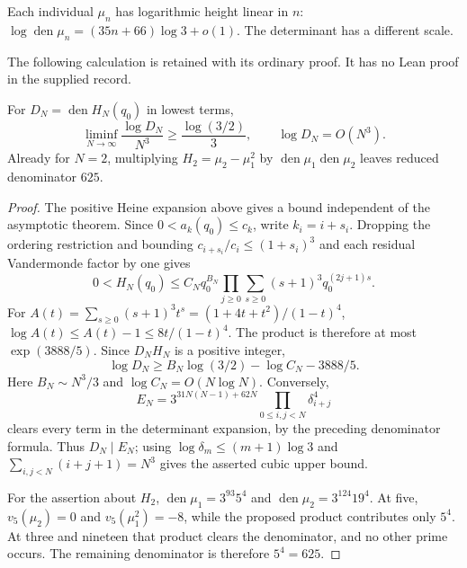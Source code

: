 \documentclass[11pt]{article}
\begin{document}
Each individual $\mu_n$ has logarithmic height linear in $n$:
$\log\operatorname{den}\mu_n=(35n+66)\log3+o(1)$.
The determinant has a different scale.

The following calculation is retained with its ordinary proof. It has
no Lean proof in the supplied record.

\begin{remark}
\label{long1049:prop:calibrated-height}
For $D_N=\operatorname{den}H_N(q_0)$ in lowest terms,
\[
 \liminf_{N\to\infty}\frac{\log D_N}{N^3}
       \ge\frac{\log(3/2)}3,
 \qquad \log D_N=O(N^3).
\]
Already for $N=2$, multiplying $H_2=\mu_2-\mu_1^2$ by
$\operatorname{den}\mu_1\operatorname{den}\mu_2$ leaves reduced
denominator $625$.
\end{remark}

\begin{proof}
The positive Heine expansion above gives a bound independent of the
asymptotic theorem.  Since $0<a_k(q_0)\le c_k$, write $k_i=i+s_i$.
Dropping the ordering restriction and bounding
$c_{i+s_i}/c_i\le(1+s_i)^3$ and each residual Vandermonde factor by
one gives
\[
 0<H_N(q_0)\le C_Nq_0^{B_N}
   \prod_{j\ge0}\sum_{s\ge0}(s+1)^3q_0^{(2j+1)s}.
\]
For $A(t)=\sum_{s\ge0}(s+1)^3t^s=(1+4t+t^2)/(1-t)^4$,
$\log A(t)\le A(t)-1\le8t/(1-t)^4$.  The product is therefore at
most $\exp(3888/5)$.  Since $D_NH_N$ is a positive integer,
\[
 \log D_N\ge B_N\log(3/2)-\log C_N-3888/5.
\]
Here $B_N\sim N^3/3$ and $\log C_N=O(N\log N)$.
Conversely,
\[
 E_N=3^{31N(N-1)+62N}\prod_{0\le i,j<N}\delta_{i+j}^{4}
\]
clears every term in the determinant expansion, by the preceding
denominator formula.  Thus $D_N\mid E_N$; using
$\log\delta_m\le(m+1)\log3$ and
$\sum_{i,j<N}(i+j+1)=N^3$ gives the asserted cubic upper bound.

For the assertion about $H_2$,
$\operatorname{den}\mu_1=3^{93}5^4$ and
$\operatorname{den}\mu_2=3^{124}19^4$.
At five, $v_5(\mu_2)=0$ and $v_5(\mu_1^2)=-8$,
while the proposed product contributes only $5^4$.
At three and nineteen that product clears the denominator, and no
other prime occurs.  The remaining denominator is therefore $5^4=625$.
\end{proof}
\end{document}
